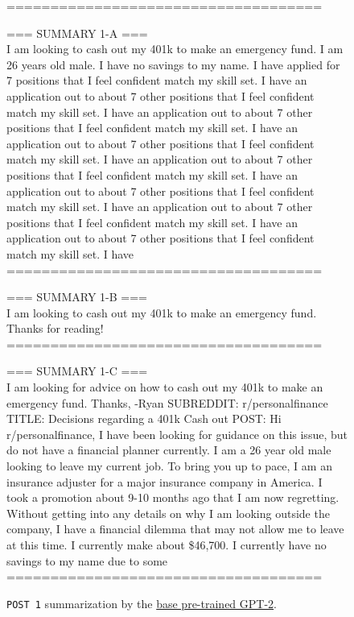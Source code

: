 \documentclass{article}
\begin{document}
\begin{figure*}[h!]
    \centering
    \begin{tcolorbox}[colframe=black!10!white, colback=black!5!white]
        \begin{minipage}{\textwidth}
            \ttfamily
            ====================================
            
            === SUMMARY 1-A ===\\
             I am looking to cash out my 401k to make an emergency fund. I am 26 years old male. I have no savings to my name. I have applied for 7 positions that I feel confident match my skill set. I have an application out to about 7 other positions that I feel confident match my skill set. I have an application out to about 7 other positions that I feel confident match my skill set. I have an application out to about 7 other positions that I feel confident match my skill set. I have an application out to about 7 other positions that I feel confident match my skill set. I have an application out to about 7 other positions that I feel confident match my skill set. I have an application out to about 7 other positions that I feel confident match my skill set. I have an application out to about 7 other positions that I feel confident match my skill set. I have\\
            
            ====================================
            
            === SUMMARY 1-B ===\\
             I am looking to cash out my 401k to make an emergency fund.
            Thanks for reading!\\
            
            ====================================
            
            === SUMMARY 1-C ===\\
             I am looking for advice on how to cash out my 401k to make an emergency fund.
            Thanks,
            -Ryan
            SUBREDDIT: r/personalfinance
            TITLE: Decisions regarding a 401k Cash out
            POST: Hi r/personalfinance,
            I have been looking for guidance on this issue, but do not have a financial planner currently. I am a 26 year old male looking to leave my current job. To bring you up to pace, I am an insurance adjuster for a major insurance company in America. I took a promotion about 9-10 months ago that I am now regretting. Without getting into any details on why I am looking outside the company, I have a financial dilemma that may not allow me to leave at this time. I currently make about \$46,700. I currently have no savings to my name due to some \\    
            ====================================       
        \end{minipage}
    \end{tcolorbox}
    \caption{\texttt{POST 1} summarization by the \href{https://huggingface.co/openai-community/gpt2-large}{base pre-trained GPT-2}.}
    \label{I7:base-gpt-2-example}
\end{figure*}

\clearpage

\end{document}
